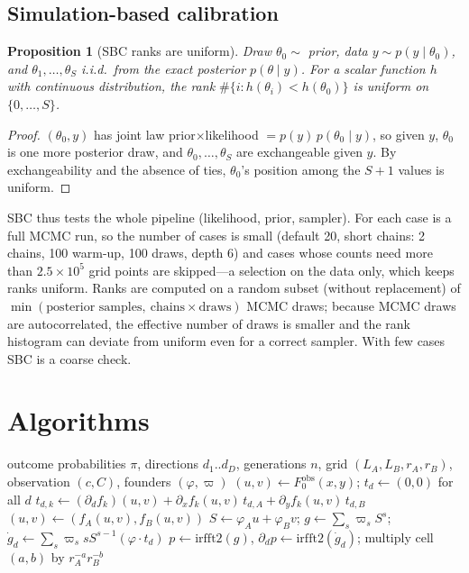\documentclass[11pt]{article}
\newtheorem{proposition}[theorem]{Proposition}
\theoremstyle{definition}
\theoremstyle{remark}
\newcommand{\code}[1]{\texttt{\detokenize{#1}}}
\begin{document}
\subsection{Simulation-based calibration}
\begin{proposition}[SBC ranks are uniform]\label{prop:sbc}
Draw $\theta_0\sim$ prior, data $y\sim p(y\mid\theta_0)$, and $\theta_1,\dots,\theta_S$ i.i.d.\ from the exact posterior $p(\theta\mid y)$. For a scalar function $h$ with continuous distribution, the rank $\#\{i:h(\theta_i)<h(\theta_0)\}$ is uniform on $\{0,\dots,S\}$.
\end{proposition}
\begin{proof}
$(\theta_0,y)$ has joint law prior$\times$likelihood $=p(y)\,p(\theta_0\mid y)$, so given $y$, $\theta_0$ is one more posterior draw, and $\theta_0,\dots,\theta_S$ are exchangeable given $y$. By exchangeability and the absence of ties, $\theta_0$'s position among the $S+1$ values is uniform.
\end{proof}
\noindent SBC thus tests the whole pipeline (likelihood, prior, sampler). For \code{exact_gw} each case is a full MCMC run, so the number of cases is small (default 20, short chains: 2 chains, 100 warm-up, 100 draws, depth 6) and cases whose counts need more than $2.5\times10^5$ grid points are skipped---a selection on the data only, which keeps ranks uniform. Ranks are computed on a random subset (without replacement) of $\min(\text{posterior samples},\ \text{chains}\times\text{draws})$ MCMC draws; because MCMC draws are autocorrelated, the effective number of draws is smaller and the rank histogram can deviate from uniform even for a correct sampler. With few cases SBC is a coarse check.

\section{Algorithms}\label{sec:algorithms}
\begin{algorithm}[H]
\caption{Exact law and directional derivatives at one endpoint (\code{law_and_jac})}
\begin{algorithmic}[1]
\Require outcome probabilities $\pi$, directions $d_1..d_D$, generations $n$, grid $(L_A,L_B,r_A,r_B)$, observation $(c,C)$, founders $(\varphi,\varpi)$
  \State $(u,v)\gets F^{\mathrm{obs}}_0(x,y)$; $t_d\gets(0,0)$ for all $d$
    \State $t_{d,k}\gets(\partial_{d}f_k)(u,v)+\partial_xf_k(u,v)\,t_{d,A}+\partial_yf_k(u,v)\,t_{d,B}$ 
    \State $(u,v)\gets(f_A(u,v),f_B(u,v))$
  \EndFor
  \State $S\gets\varphi_Au+\varphi_Bv$; $g\gets\sum_s\varpi_sS^s$; $\dot g_d\gets\sum_s\varpi_s sS^{s-1}(\varphi\cdot t_d)$
\EndFor
\State $p\gets\mathrm{irfft2}(g)$, $\partial_dp\gets\mathrm{irfft2}(\dot g_d)$; multiply cell $(a,b)$ by $r_A^{-a}r_B^{-b}$
\end{algorithmic}
\end{algorithm}
\end{document}
